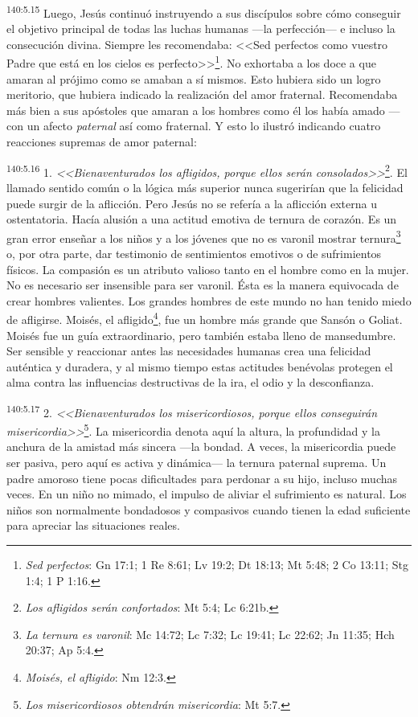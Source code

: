 \par 
\textsuperscript{140:5.15} Luego, Jesús continuó instruyendo a sus discípulos sobre cómo conseguir el objetivo principal de todas las luchas humanas ---la perfección--- e incluso la consecución divina. Siempre les recomendaba: <<Sed perfectos como vuestro Padre que está en los cielos es perfecto>>\footnote{\textit{Sed perfectos}: Gn 17:1; 1 Re 8:61; Lv 19:2; Dt 18:13; Mt 5:48; 2 Co 13:11; Stg 1:4; 1 P 1:16.}. No exhortaba a los doce a que amaran al prójimo como se amaban a sí mismos. Esto hubiera sido un logro meritorio, que hubiera indicado la realización del amor fraternal. Recomendaba más bien a sus apóstoles que amaran a los hombres como él los había amado ---con un afecto \textit{paternal} así como fraternal. Y esto lo ilustró indicando cuatro reacciones supremas de amor paternal:

\par 
\textsuperscript{140:5.16} 1. \textit{<<Bienaventurados los afligidos, porque ellos serán consolados>>}\footnote{\textit{Los afligidos serán confortados}: Mt 5:4; Lc 6:21b.}. El llamado sentido común o la lógica más superior nunca sugerirían que la felicidad puede surgir de la aflicción. Pero Jesús no se refería a la aflicción externa u ostentatoria. Hacía alusión a una actitud emotiva de ternura de corazón. Es un gran error enseñar a los niños y a los jóvenes que no es varonil mostrar ternura\footnote{\textit{La ternura es varonil}: Mc 14:72; Lc 7:32; Lc 19:41; Lc 22:62; Jn 11:35; Hch 20:37; Ap 5:4.} o, por otra parte, dar testimonio de sentimientos emotivos o de sufrimientos físicos. La compasión es un atributo valioso tanto en el hombre como en la mujer. No es necesario ser insensible para ser varonil. Ésta es la manera equivocada de crear hombres valientes. Los grandes hombres de este mundo no han tenido miedo de afligirse. Moisés, el afligido\footnote{\textit{Moisés, el afligido}: Nm 12:3.}, fue un hombre más grande que Sansón o Goliat. Moisés fue un guía extraordinario, pero también estaba lleno de mansedumbre. Ser sensible y reaccionar antes las necesidades humanas crea una felicidad auténtica y duradera, y al mismo tiempo estas actitudes benévolas protegen el alma contra las influencias destructivas de la ira, el odio y la desconfianza.

\par 
\textsuperscript{140:5.17} 2. \textit{<<Bienaventurados los misericordiosos, porque ellos conseguirán misericordia>>}\footnote{\textit{Los misericordiosos obtendrán misericordia}: Mt 5:7.}. La misericordia denota aquí la altura, la profundidad y la anchura de la amistad más sincera ---la bondad. A veces, la misericordia puede ser pasiva, pero aquí es activa y dinámica--- la ternura paternal suprema. Un padre amoroso tiene pocas dificultades para perdonar a su hijo, incluso muchas veces. En un niño no mimado, el impulso de aliviar el sufrimiento es natural. Los niños son normalmente bondadosos y compasivos cuando tienen la edad suficiente para apreciar las situaciones reales.

